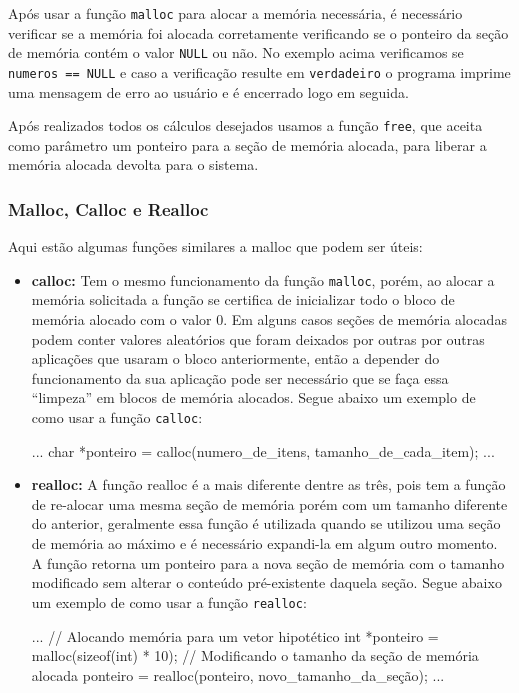 Após usar a função \texttt{malloc} para alocar a memória necessária, é 
necessário verificar se a memória foi alocada corretamente verificando se o 
ponteiro da seção de memória contém o valor \texttt{NULL} ou não. No exemplo 
acima verificamos se \texttt{numeros == NULL} e caso a verificação resulte em 
\texttt{verdadeiro} o programa imprime uma mensagem de erro ao usuário e é 
encerrado logo em seguida.

Após realizados todos os cálculos desejados usamos a função \texttt{free}, que 
aceita como parâmetro um ponteiro para a seção de memória alocada, para liberar 
a memória alocada devolta para o sistema.

\subsubsection{Malloc, Calloc e Realloc}

Aqui estão algumas funções similares a malloc que podem ser úteis:

\begin{itemize}
        \renewcommand{\labelitemi}{\tiny$\blacksquare$}
    \item \textbf{calloc:} Tem o mesmo funcionamento da função \texttt{malloc}, 
        porém, ao alocar a memória solicitada a função se certifica de 
        inicializar todo o bloco de memória alocado com o valor 0. Em alguns 
        casos seções de memória alocadas podem conter valores aleatórios que 
        foram deixados por outras por outras aplicações que usaram o bloco 
        anteriormente, então a depender do funcionamento da sua aplicação pode 
        ser necessário que se faça essa ``limpeza'' em blocos de memória 
        alocados. Segue abaixo um exemplo de como usar a função \texttt{calloc}:

        \begin{excode}
    ...
    char *ponteiro = calloc(numero_de_itens, tamanho_de_cada_item);
    ...
        \end{excode}
    \item \textbf{realloc:} A função realloc é a mais diferente dentre as três, 
        pois tem a função de re-alocar uma mesma seção de memória porém com um 
        tamanho diferente do anterior, geralmente essa função é utilizada 
        quando se utilizou uma seção de memória ao máximo e é necessário 
        expandi-la em algum outro momento. A função retorna um ponteiro para a 
        nova seção de memória com o tamanho modificado sem alterar o conteúdo 
        pré-existente daquela seção. Segue abaixo um exemplo de como usar a 
        função \texttt{realloc}:

        \begin{excode}
    ...
    // Alocando memória para um vetor hipotético
    int *ponteiro = malloc(sizeof(int) * 10);
    // Modificando o tamanho da seção de memória alocada
    ponteiro = realloc(ponteiro, novo_tamanho_da_seção);
    ...
        \end{excode}
\end{itemize}

